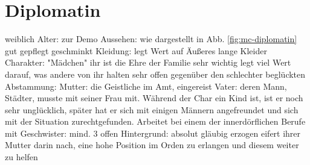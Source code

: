 \section{Diplomatin} \label{sec:mc-diplomatin}
\begin{outline}
	\1 weiblich
	\1 Alter:
		 zur Demo
	\1 Aussehen:
		\2 wie dargestellt in Abb. \ref{fig:mc-diplomatin} 
		\2 gut gepflegt 
		\2 geschminkt
	\1 Kleidung:
		\2 legt Wert auf Äußeres
		\2 lange Kleider
	\1 Charakter:
		\2 "Mädchen"
		\2 ihr ist die Ehre der Familie sehr wichtig 
		\2 legt viel Wert darauf, was andere von ihr halten 
		\2 sehr offen gegenüber den schlechter beglückten
	\1 Abstammung:
		\2 Mutter: die Geistliche im Amt, eingereist
		\2 Vater: deren Mann, Städter, musste mit seiner Frau mit. Während der Char ein Kind ist, ist er noch sehr unglücklich, später hat er sich mit einigen Männern angefreundet und sich mit der Situation zurechtgefunden. Arbeitet bei einem der innerdörflichen Berufe mit
		\2 Geschwister: mind. 3 offen
	\1 Hintergrund:
		\2 absolut gläubig erzogen
		\2 eifert ihrer Mutter darin nach, eine hohe Position im Orden zu erlangen und diesem weiter zu helfen
\end{outline}

